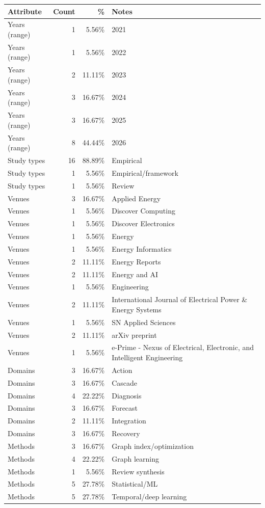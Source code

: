 \begin{inlinetable}
\caption{Descriptive overview of included studies}
\label{tab:stats}\centering\footnotesize\setlength{\tabcolsep}{3pt}
\begin{tabularx}{\columnwidth}{@{}p{}rrX@{}}\toprule
Attribute & Count & \% & Notes \\ \midrule
Years (range) & 1 & 5.56\% & 2021 \\
Years (range) & 1 & 5.56\% & 2022 \\
Years (range) & 2 & 11.11\% & 2023 \\
Years (range) & 3 & 16.67\% & 2024 \\
Years (range) & 3 & 16.67\% & 2025 \\
Years (range) & 8 & 44.44\% & 2026 \\
Study types & 16 & 88.89\% & Empirical \\
Study types & 1 & 5.56\% & Empirical/framework \\
Study types & 1 & 5.56\% & Review \\
Venues & 3 & 16.67\% & Applied Energy \\
Venues & 1 & 5.56\% & Discover Computing \\
Venues & 1 & 5.56\% & Discover Electronics \\
Venues & 1 & 5.56\% & Energy \\
Venues & 1 & 5.56\% & Energy Informatics \\
Venues & 2 & 11.11\% & Energy Reports \\
Venues & 2 & 11.11\% & Energy and AI \\
Venues & 1 & 5.56\% & Engineering \\
Venues & 2 & 11.11\% & International Journal of Electrical Power \& Energy Systems \\
Venues & 1 & 5.56\% & SN Applied Sciences \\
Venues & 2 & 11.11\% & arXiv preprint \\
Venues & 1 & 5.56\% & e-Prime - Nexus of Electrical, Electronic, and Intelligent Engineering \\
Domains & 3 & 16.67\% & Action \\
Domains & 3 & 16.67\% & Cascade \\
Domains & 4 & 22.22\% & Diagnosis \\
Domains & 3 & 16.67\% & Forecast \\
Domains & 2 & 11.11\% & Integration \\
Domains & 3 & 16.67\% & Recovery \\
Methods & 3 & 16.67\% & Graph index/optimization \\
Methods & 4 & 22.22\% & Graph learning \\
Methods & 1 & 5.56\% & Review synthesis \\
Methods & 5 & 27.78\% & Statistical/ML \\
Methods & 5 & 27.78\% & Temporal/deep learning \\
\bottomrule\end{tabularx}
\end{inlinetable}

